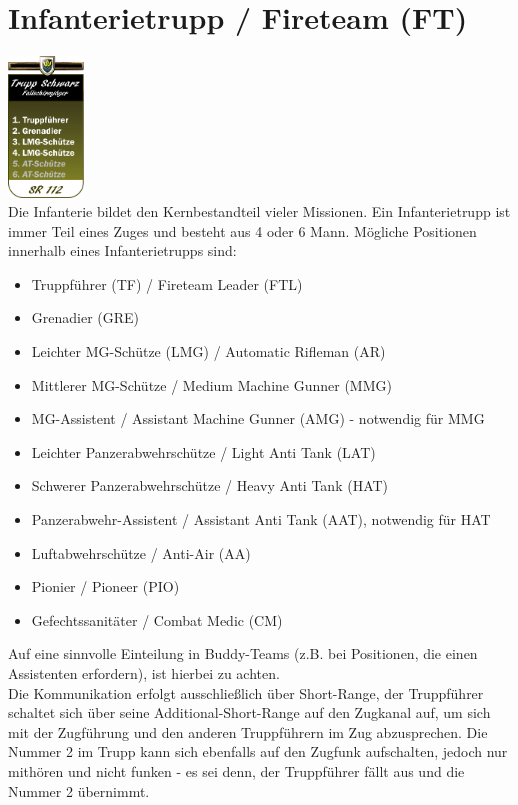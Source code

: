 \section{Infanterietrupp / Fireteam (FT)}
\includegraphics[width=20mm]{./img/truppenordnung/infanterie/infanterie.png}\\
Die Infanterie bildet den Kernbestandteil vieler Missionen. Ein Infanterietrupp ist immer Teil eines Zuges und besteht aus 4 oder 6 Mann. Mögliche Positionen innerhalb eines Infanterietrupps sind:
\begin{itemize}
	\item Truppführer (TF) / Fireteam Leader (FTL)
	\item Grenadier (GRE)
	\item Leichter MG-Schütze (LMG) / Automatic Rifleman (AR)
	\item Mittlerer MG-Schütze / Medium Machine Gunner (MMG)
	\item MG-Assistent / Assistant Machine Gunner (AMG) - notwendig für MMG
	\item Leichter Panzerabwehrschütze / Light Anti Tank (LAT)
	\item Schwerer Panzerabwehrschütze / Heavy Anti Tank (HAT)
	\item Panzerabwehr-Assistent / Assistant Anti Tank (AAT), notwendig für HAT
	\item Luftabwehrschütze / Anti-Air (AA)
	\item Pionier / Pioneer (PIO)
	\item Gefechtssanitäter / Combat Medic (CM)
\end{itemize}
Auf eine sinnvolle Einteilung in Buddy-Teams (z.B. bei Positionen, die einen Assistenten erfordern), ist hierbei zu achten.\\
Die Kommunikation erfolgt ausschließlich über Short-Range, der Truppführer schaltet sich über seine Additional-Short-Range auf den Zugkanal auf, um sich mit der Zugführung und den anderen Truppführern im Zug abzusprechen. Die Nummer 2 im Trupp kann sich ebenfalls auf den Zugfunk aufschalten, jedoch nur mithören und nicht funken - es sei denn, der Truppführer fällt aus und die Nummer 2 übernimmt.